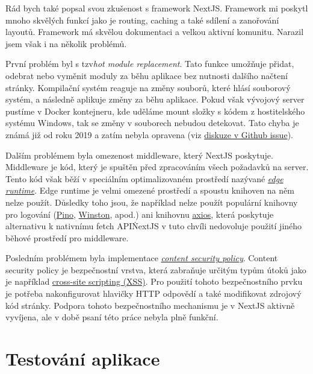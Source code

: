 Rád bych také popsal svou zkušenost s framework NextJS\@.
Framework mi poskytl mnoho skvělých funkcí jako je routing, caching a také sdílení a zanořování layoutů.
Framework má skvělou dokumentaci a velkou aktivní komunitu.
Narazil jsem však i na několik problémů.

První problém byl s tzv\. \textit{hot module replacement}.
Tato funkce umožňuje přidat, odebrat nebo vyměnit moduly za běhu aplikace bez nutnosti dalšího načtení stránky.
Kompilační systém reaguje na změny souborů, které hlásí souborový systém, a následně aplikuje změny za běhu aplikace.
Pokud však vývojový server pustíme v Docker kontejneru, kde uděláme mount složky s kódem z hostitelského systému Windows, tak se změny v souborech nebudou detekovat.
Tato chyba je známá již od roku 2019 a zatím nebyla opravena (viz \href{https://github.com/microsoft/WSL/issues/4739}{diskuze v Github issue}).

Dalším problémem byla omezenost middleware, který NextJS poskytuje.
Middleware je kód, který je spuštěn před zpracováním všech požadavků na server.
Tento kód však běží v speciálním optimalizovaném prostředí nazývané \textit{\href{https://edge-runtime.vercel.app/}{edge runtime}}.
Edge runtime je velmi omezené prostředí a spoustu knihoven na něm nelze použít.
Důsledky toho jsou, že například nelze použít populární knihovny pro logování (\href{https://github.com/pinojs/pino}{Pino}, \href{https://github.com/winstonjs/winston}{Winston}, apod.) ani knihovnu \href{https://github.com/axios/axios}{axios}, která poskytuje alternativu k nativnímu fetch API\.
NextJS v tuto chvíli nedovoluje použití jiného běhové prostředí pro middleware.

Posledním problémem byla implementace \textit{\href{https://developer.mozilla.org/en-US/docs/Web/HTTP/CSP}{content security policy}}.
Content security policy je bezpečnostní vrstva, která zabraňuje určitým typům útoků jako je například \href{https://developer.mozilla.org/en-US/docs/Glossary/Cross-site_scripting}{cross-site scripting (XSS)}.
Pro použití tohoto bezpečnostního prvku je potřeba nakonfigurovat hlavičky HTTP odpovědí a také modifikovat zdrojový kód stránky.
Podpora tohoto bezpečnostního mechanismu je v NextJS aktivně vyvíjena, ale v době psaní této práce nebyla plně funkční.


\section{Testování aplikace}\label{sec:testovani-aplikace}

